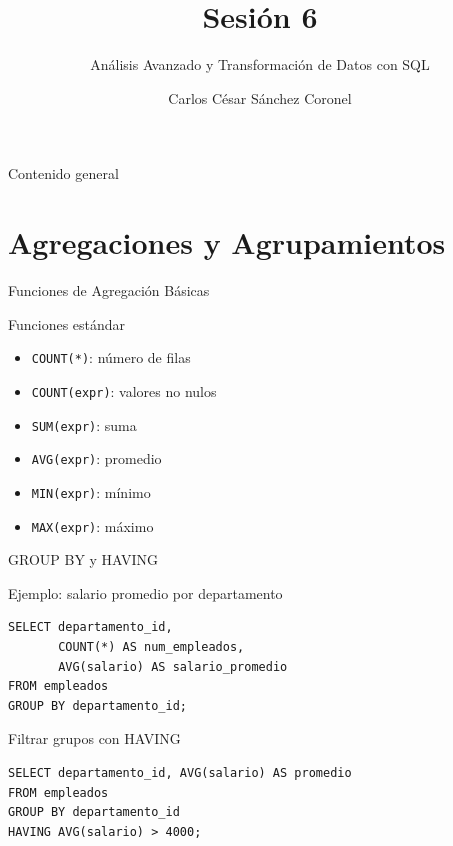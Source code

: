 \documentclass[aspectratio=169, 10pt, xcolor=table]{beamer}
\title[SESIÓN 6 BBDD]{\textbf{Sesión 6}}
\subtitle{Análisis Avanzado y Transformación de Datos con SQL}
\author[Prof. C. Sánchez]{Carlos César Sánchez Coronel}
\institute{\textbf{BASES DE DATOS}}
\date{}
\begin{document}
\begin{frame}
    \titlepage
\end{frame}

\begin{frame}{Contenido general}
    \tableofcontents
\end{frame}

\section{Agregaciones y Agrupamientos}

\begin{frame}{Funciones de Agregación Básicas}
    \begin{block}{Funciones estándar}
        \begin{itemize}
            \item \texttt{COUNT(*)}: número de filas
            \item \texttt{COUNT(expr)}: valores no nulos
            \item \texttt{SUM(expr)}: suma
            \item \texttt{AVG(expr)}: promedio
            \item \texttt{MIN(expr)}: mínimo
            \item \texttt{MAX(expr)}: máximo
        \end{itemize}
    \end{block}
\end{frame}

\begin{frame}[fragile]{GROUP BY y HAVING}
    \begin{block}{Ejemplo: salario promedio por departamento}
        \begin{lstlisting}
SELECT departamento_id,
       COUNT(*) AS num_empleados,
       AVG(salario) AS salario_promedio
FROM empleados
GROUP BY departamento_id;
        \end{lstlisting}
    \end{block}
    \begin{block}{Filtrar grupos con HAVING}
        \begin{lstlisting}
SELECT departamento_id, AVG(salario) AS promedio
FROM empleados
GROUP BY departamento_id
HAVING AVG(salario) > 4000;
        \end{lstlisting}
    \end{block}
\end{frame}
\end{document}
